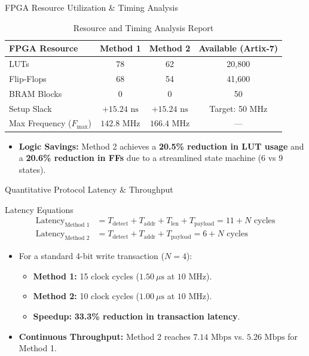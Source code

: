 \documentclass{beamer}
\begin{document}
\begin{frame}{FPGA Resource Utilization \& Timing Analysis}
  \begin{table}
    \centering\small
    \begin{tabular}{lccc}
      \toprule
      \textbf{FPGA Resource} & \textbf{Method 1} & \textbf{Method 2} & \textbf{Available (Artix-7)} \\
      \midrule
      LUTs & 78 & 62 & 20,800 \\
      Flip-Flops & 68 & 54 & 41,600 \\
      BRAM Blocks & 0 & 0 & 50 \\
      Setup Slack & $+15.24\text{ ns}$ & $+15.24\text{ ns}$ & Target: 50 MHz \\
      Max Frequency ($F_{\text{max}}$) & $142.8\text{ MHz}$ & $166.4\text{ MHz}$ & — \\
      \bottomrule
    \end{tabular}
    \caption{Resource and Timing Analysis Report}
  \end{table}
  \begin{itemize}
    \item \textbf{Logic Savings:} Method 2 achieves a \textbf{20.5\% reduction in LUT usage} and a \textbf{20.6\% reduction in FFs} due to a streamlined state machine (6 vs 9 states).
  \end{itemize}
\end{frame}

\begin{frame}{Quantitative Protocol Latency \& Throughput}
  \begin{block}{Latency Equations}
    \begin{align*}
      \text{Latency}_{\text{Method 1}} &= T_{\text{detect}} + T_{\text{addr}} + T_{\text{len}} + T_{\text{payload}} = 11 + N \text{ cycles} \\
      \text{Latency}_{\text{Method 2}} &= T_{\text{detect}} + T_{\text{addr}} + T_{\text{payload}} = 6 + N \text{ cycles}
    \end{align*}
  \end{block}
  \begin{itemize}
    \item For a standard 4-bit write transaction ($N=4$):
    \begin{itemize}
      \item \textbf{Method 1:} 15 clock cycles ($1.50\ \mu\text{s}$ at $10\text{ MHz}$).
      \item \textbf{Method 2:} 10 clock cycles ($1.00\ \mu\text{s}$ at $10\text{ MHz}$).
      \item \textbf{Speedup:} \textbf{33.3\% reduction in transaction latency}.
    \end{itemize}
    \item \textbf{Continuous Throughput:} Method 2 reaches $7.14\text{ Mbps}$ vs. $5.26\text{ Mbps}$ for Method 1.
  \end{itemize}
\end{frame}
\end{document}

